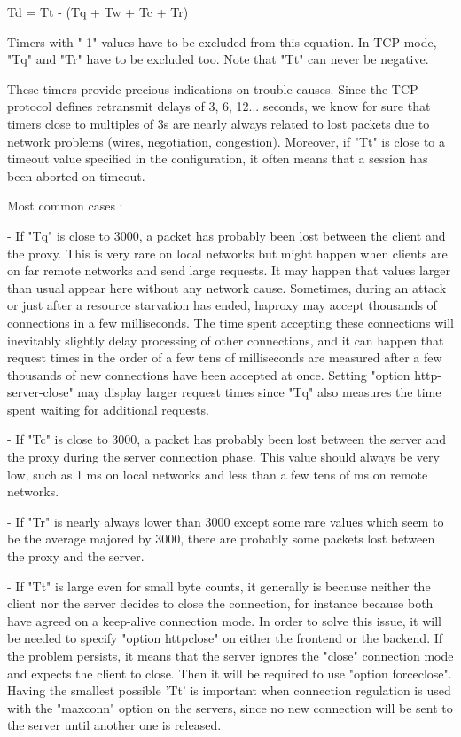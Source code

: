         Td = Tt - (Tq + Tw + Tc + Tr)

    Timers with "-1" values have to be excluded from this equation. In TCP
    mode, "Tq" and "Tr" have to be excluded too. Note that "Tt" can never be
    negative.

These timers provide precious indications on trouble causes. Since the TCP
protocol defines retransmit delays of 3, 6, 12... seconds, we know for sure
that timers close to multiples of 3s are nearly always related to lost packets
due to network problems (wires, negotiation, congestion). Moreover, if "Tt" is
close to a timeout value specified in the configuration, it often means that a
session has been aborted on timeout.

Most common cases :

  - If "Tq" is close to 3000, a packet has probably been lost between the
    client and the proxy. This is very rare on local networks but might happen
    when clients are on far remote networks and send large requests. It may
    happen that values larger than usual appear here without any network cause.
    Sometimes, during an attack or just after a resource starvation has ended,
    haproxy may accept thousands of connections in a few milliseconds. The time
    spent accepting these connections will inevitably slightly delay processing
    of other connections, and it can happen that request times in the order of
    a few tens of milliseconds are measured after a few thousands of new
    connections have been accepted at once. Setting "option http-server-close"
    may display larger request times since "Tq" also measures the time spent
    waiting for additional requests.

  - If "Tc" is close to 3000, a packet has probably been lost between the
    server and the proxy during the server connection phase. This value should
    always be very low, such as 1 ms on local networks and less than a few tens
    of ms on remote networks.

  - If "Tr" is nearly always lower than 3000 except some rare values which seem
    to be the average majored by 3000, there are probably some packets lost
    between the proxy and the server.

  - If "Tt" is large even for small byte counts, it generally is because
    neither the client nor the server decides to close the connection, for
    instance because both have agreed on a keep-alive connection mode. In order
    to solve this issue, it will be needed to specify "option httpclose" on
    either the frontend or the backend. If the problem persists, it means that
    the server ignores the "close" connection mode and expects the client to
    close. Then it will be required to use "option forceclose". Having the
    smallest possible 'Tt' is important when connection regulation is used with
    the "maxconn" option on the servers, since no new connection will be sent
    to the server until another one is released.


